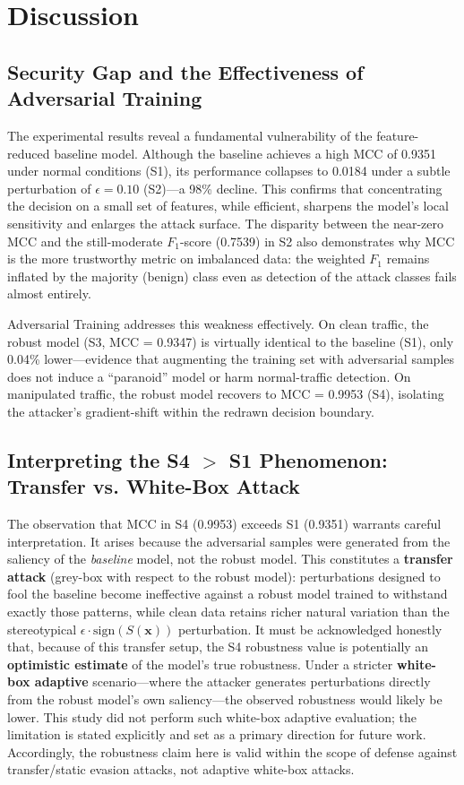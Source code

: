 \documentclass[11pt, a4paper]{article}
\begin{document}
\section{Discussion}

\subsection{Security Gap and the Effectiveness of Adversarial Training}
The experimental results reveal a fundamental vulnerability of the feature-reduced baseline model. Although the baseline achieves a high MCC of 0.9351 under normal conditions (S1), its performance collapses to 0.0184 under a subtle perturbation of $\epsilon = 0.10$ (S2)---a 98\% decline. This confirms that concentrating the decision on a small set of features, while efficient, sharpens the model's local sensitivity and enlarges the attack surface. The disparity between the near-zero MCC and the still-moderate $F_1$-score (0.7539) in S2 also demonstrates why MCC is the more trustworthy metric on imbalanced data: the weighted $F_1$ remains inflated by the majority (benign) class even as detection of the attack classes fails almost entirely.

Adversarial Training addresses this weakness effectively. On clean traffic, the robust model (S3, MCC = 0.9347) is virtually identical to the baseline (S1), only 0.04\% lower---evidence that augmenting the training set with adversarial samples does not induce a ``paranoid'' model or harm normal-traffic detection. On manipulated traffic, the robust model recovers to MCC = 0.9953 (S4), isolating the attacker's gradient-shift within the redrawn decision boundary.

\subsection{Interpreting the S4 $>$ S1 Phenomenon: Transfer vs. White-Box Attack}
The observation that MCC in S4 (0.9953) exceeds S1 (0.9351) warrants careful interpretation. It arises because the adversarial samples were generated from the saliency of the \textit{baseline} model, not the robust model. This constitutes a \textbf{transfer attack} (grey-box with respect to the robust model): perturbations designed to fool the baseline become ineffective against a robust model trained to withstand exactly those patterns, while clean data retains richer natural variation than the stereotypical $\epsilon \cdot \text{sign}(S(\mathbf{x}))$ perturbation. It must be acknowledged honestly that, because of this transfer setup, the S4 robustness value is potentially an \textbf{optimistic estimate} of the model's true robustness. Under a stricter \textbf{white-box adaptive} scenario---where the attacker generates perturbations directly from the robust model's own saliency---the observed robustness would likely be lower. This study did not perform such white-box adaptive evaluation; the limitation is stated explicitly and set as a primary direction for future work. Accordingly, the robustness claim here is valid within the scope of defense against transfer/static evasion attacks, not adaptive white-box attacks.
\end{document}
